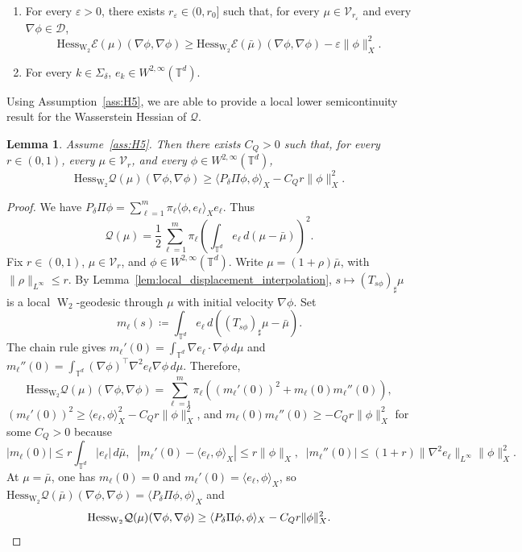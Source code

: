 \documentclass[11pt]{article}
\numberwithin{equation}{section}
\newtheorem{lemma}[theorem]{Lemma}
\theoremstyle{definition}
\newcommand{\T}{\mathbb{T}}
\newcommand{\E}{\mathcal{E}}
\newcommand{\Wtwo}{\operatorname{W}_2}
\begin{document}
\begin{enumerate}[label=(H\arabic*),ref=(H\arabic*), start=4]
    \item\label{ass:H4} For every $\varepsilon > 0$, there exists $r_\varepsilon \in (0, r_0]$ such that, for every $\mu \in \mathcal{V}_{r_\varepsilon}$ and every $\nabla \phi \in \mathscr{D}$,
    \[
    \mathrm{Hess}_{\Wtwo} \E(\mu)(\nabla\phi, \nabla\phi) \ge \mathrm{Hess}_{\Wtwo} \E(\bar\mu)(\nabla\phi, \nabla\phi) - \varepsilon\|\phi\|_X^2.
    \]
    \item\label{ass:H5} For every $k \in \Sigma_\delta$, $e_k \in W^{2,\infty}(\T^d)$.
\end{enumerate}

Using Assumption~\ref{ass:H5}, we are able to provide a local lower semicontinuity result for the Wasserstein Hessian of $\mathcal{Q}$.

\begin{lemma}
\label{lem:finite_rank_hessian_continuity}
    Assume~\ref{ass:H5}.
    Then there exists $C_Q > 0$ such that, for every $r \in (0,1)$, every $\mu \in \mathcal{V}_r$, and every $\phi \in W^{2,\infty}(\T^d)$,
    \[
    \mathrm{Hess}_{\Wtwo} \mathcal{Q}(\mu)(\nabla\phi, \nabla\phi) \ge \langle P_\delta\Pi\phi,\phi\rangle_X - C_Q r \|\phi\|_X^2.
    \]
\end{lemma}

\begin{proof}
    We have $P_\delta\Pi \phi = \sum_{\ell=1}^m \pi_\ell \langle \phi,e_\ell\rangle_X e_\ell$.
    Thus
    \[
    \mathcal{Q}(\mu) = \frac{1}{2} \sum_{\ell=1}^m \pi_\ell\left(\int_{\T^d} e_\ell \, d(\mu - \bar\mu)\right)^2.
    \]
    Fix $r \in (0,1)$, $\mu \in \mathcal{V}_r$, and $\phi \in W^{2,\infty}(\T^d)$.
    Write $\mu = (1+\rho)\bar\mu$, with $\|\rho\|_{L^\infty}\le r$.
    By Lemma~\ref{lem:local_displacement_interpolation}, $s \mapsto (T_{s\phi})_\sharp\mu$ is a local $\Wtwo$-geodesic through $\mu$ with initial velocity $\nabla\phi$.
    Set
    \[
    m_\ell(s) \coloneqq \int_{\T^d} e_\ell \, d((T_{s\phi})_\sharp\mu - \bar\mu).
    \]
    The chain rule gives $m_\ell'(0) = \int_{\T^d} \nabla e_\ell \cdot \nabla\phi \, d\mu$ and $m_\ell''(0) = \int_{\T^d} (\nabla\phi)^\top \nabla^2 e_\ell \nabla\phi \, d\mu$.
    Therefore,
    \[
    \mathrm{Hess}_{\Wtwo} \mathcal{Q}(\mu)(\nabla\phi,\nabla\phi) = \sum_{\ell=1}^m \pi_\ell ((m_\ell'(0))^2 + m_\ell(0) m_\ell''(0)),
    \]
    $(m_\ell'(0))^2 \ge \langle e_\ell,\phi\rangle_X^2 - C_Q r\|\phi\|_X^2$, and $m_\ell(0)m_\ell''(0)\ge - C_Q r\|\phi\|_X^2$ for some $C_Q > 0$ because
    \[
    |m_\ell(0)| \le r\int_{\T^d} |e_\ell| \, d\bar\mu, \;\; |m_\ell'(0) - \langle e_\ell,\phi\rangle_X| \le r\|\phi\|_X, \;\; |m_\ell''(0)| \le (1+r)\|\nabla^2 e_\ell\|_{L^\infty}\|\phi\|_X^2.
    \]
    At $\mu = \bar\mu$, one has $m_\ell(0) = 0$ and $m_\ell'(0)= \langle e_\ell, \phi\rangle_X$, so $\mathrm{Hess}_{\Wtwo} \mathcal{Q}(\bar\mu)(\nabla\phi,\nabla\phi) = \langle P_\delta\Pi\phi,\phi\rangle_X$ and
    \[
    \mathrm{Hess}_{\Wtwo} \mathcal{Q}(\mu)(\nabla\phi,\nabla\phi) \ge \langle P_\delta\Pi\phi,\phi\rangle_X - C_Q r\|\phi\|_X^2. \qedhere
    \]
\end{proof}
\end{document}
